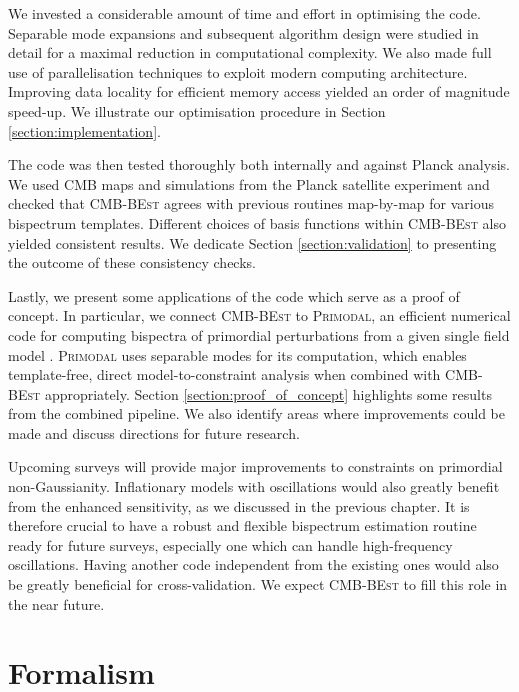 We invested a considerable amount of time and effort in optimising the code. Separable mode expansions and subsequent algorithm design were studied in detail for a maximal reduction in computational complexity. We also made full use of parallelisation techniques to exploit modern computing architecture. Improving data locality for efficient memory access yielded an order of magnitude speed-up. We illustrate our optimisation procedure in Section \ref{section:implementation}.

The code was then tested thoroughly both internally and against Planck analysis. We used CMB maps and simulations from the Planck satellite experiment and checked that \textsc{CMB-BEst} agrees with previous routines map-by-map for various bispectrum templates. Different choices of basis functions within \textsc{CMB-BEst} also yielded consistent results. We dedicate Section \ref{section:validation} to presenting the outcome of these consistency checks.

Lastly, we present some applications of the code which serve as a proof of concept. In particular, we connect \textsc{CMB-BEst} to \textsc{Primodal}, an efficient numerical code for computing bispectra of primordial perturbations from a given single field model \cite{Clarke2021}. \textsc{Primodal} uses separable modes for its computation, which enables template-free, direct model-to-constraint analysis when combined with \textsc{CMB-BEst} appropriately. Section \ref{section:proof_of_concept} highlights some results from the combined pipeline. We also identify areas where improvements could be made and discuss directions for future research.

Upcoming surveys will provide major improvements to constraints on primordial non-Gaussianity. Inflationary models with oscillations would also greatly benefit from the enhanced sensitivity, as we discussed in the previous chapter. It is therefore crucial to have a robust and flexible bispectrum estimation routine ready for future surveys, especially one which can handle high-frequency oscillations. Having another code independent from the existing ones would also be greatly beneficial for cross-validation. We expect \textsc{CMB-BEst} to fill this role in the near future.


\section{Formalism}

